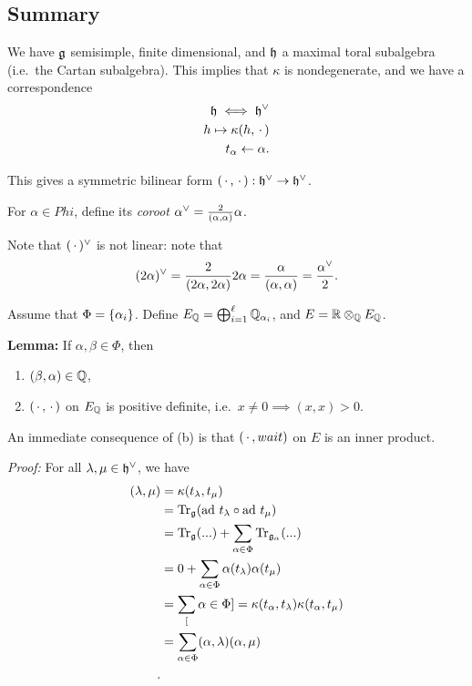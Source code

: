 \hypertarget{summary}{%
\subsection{Summary}\label{summary}}

We have \({\mathfrak{g}}\) semisimple, finite dimensional, and \({\mathfrak{h}}\) a
maximal toral subalgebra (i.e.~the Cartan subalgebra). This implies that
\(\kappa\) is nondegenerate, and we have a correspondence \begin{align*}
{\mathfrak{h}} \iff {\mathfrak{h}}^\vee \\
h \mapsto \kappa(h, {\,\cdot\,}) \\
t_\alpha \leftarrow \alpha
.\end{align*}

This gives a symmetric bilinear form
\(({\,\cdot\,}, {\,\cdot\,}): {\mathfrak{h}}^\vee \to {\mathfrak{h}}^\vee\).

For \(\alpha \in Phi\), define its \emph{coroot}
\(\alpha^\vee = \frac{2}{(\alpha, \alpha)}\alpha\).

Note that \(({\,\cdot\,})^\vee\) is not linear: note that \begin{align*}
(2\alpha)^\vee = 
\frac{2}{(2\alpha, 2\alpha)} 2\alpha 
= \frac{\alpha}{(\alpha, \alpha)} 
= \frac{\alpha^\vee}{2}
.\end{align*}

Assume that \(\Phi = \left\{{\alpha_i}\right\}\). Define
\(E_{\mathbb{Q}} = \bigoplus_{i=1}^\ell {\mathbb{Q}}_{\alpha_i}\), and
\(E = {\mathbb{R}} \otimes_{\mathbb{Q}} E_{\mathbb{Q}}\).

\textbf{Lemma:} If \(\alpha, \beta \in \Phi\), then

\begin{enumerate}
\def\labelenumi{\alph{enumi}.}
\tightlist
\item
  \((\beta, \alpha) \in {\mathbb{Q}}\),
\item
  \(({\,\cdot\,}, {\,\cdot\,})\) on \(E_{\mathbb{Q}}\) is positive definite,
  i.e.~\(x\neq 0 \implies (x, x) > 0\).
\end{enumerate}

An immediate consequence of (b) is that \(({\,\cdot\,}, wait)\) on \(E\) is an
inner product.

\emph{Proof:} For all \(\lambda, \mu \in {\mathfrak{h}}^\vee\), we have
\begin{align*}
(\lambda, \mu) 
&= \kappa(t_\lambda, t_\mu) \\
&= \mathrm{Tr}_{\mathfrak{g}}(\mathrm{ad}~ t_\lambda \circ \mathrm{ad}~ t_\mu) \\
&= \mathrm{Tr}_{\mathfrak{g}}(...) + \sum_{\alpha \in \Phi} \mathrm{Tr}_{{\mathfrak{g}}_\alpha}(...) \\
&= 0 + \sum_{\alpha \in \Phi} \alpha(t_\lambda) \alpha(t_\mu) \\
&= \sum_[\alpha \in \Phi] = \kappa(t_\alpha, t_\lambda) \kappa(t_\alpha, t_\mu) \\
&= \sum_{\alpha \in \Phi} (\alpha, \lambda)(\alpha, \mu) \\
.\end{align*}

